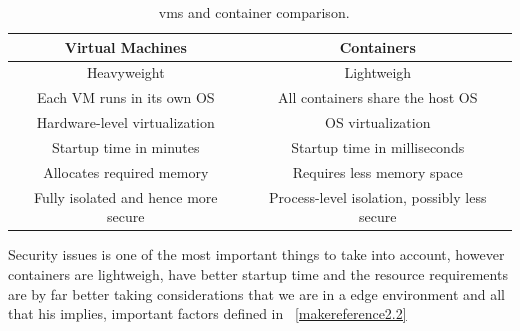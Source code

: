 \begin{table}
    \begin{center}
    \begin{tabular}[h]{|c|c|}
        \hline
        \textbf{Virtual Machines} & \textbf{Containers}\\
        \hline
        Heavyweight & Lightweigh\\
        Each VM runs in its own OS	 & All containers share the host OS\\
        Hardware-level virtualization & OS virtualization \\
        Startup time in minutes	 & Startup time in milliseconds \\
        Allocates required memory & Requires less memory space \\
        Fully isolated and hence more secure & Process-level isolation, possibly less secure\\
        \hline
    \end{tabular}
    \caption{vms and container comparison. ~\cite{virt_comparison}}
    \label{table1}
   \end{center}
\end{table}


Security issues is one of the most important things to take into account, however containers are lightweigh, have better startup time and the resource requirements are by far better taking considerations that we are in a edge environment and all that his implies, important factors defined in ~\ref{makereference2.2}

